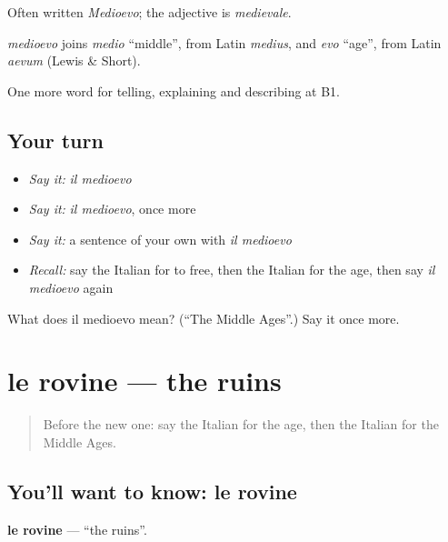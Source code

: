 Often written \emph{Medioevo}; the adjective is \emph{medievale}.

\begin{cousinweb}
\emph{medioevo} joins \emph{medio} \textquotedblleft{}middle\textquotedblright{}, from Latin \emph{medius}, and \emph{evo} \textquotedblleft{}age\textquotedblright{}, from Latin \emph{aevum} (Lewis \& Short).
\end{cousinweb}

\begin{grammarlens}[title={What you've built}]
One more word for telling, explaining and describing at B1.
\end{grammarlens}

\subsection*{Your turn}
\begin{itemize}
\raggedright
  \item \emph{Say it:} \emph{il medioevo}
  \item \emph{Say it:} \emph{il medioevo}, once more
  \item \emph{Say it:} a sentence of your own with \emph{il medioevo}
  \item \emph{Recall:} say the Italian for to free, then the Italian for the age, then say \emph{il medioevo} again
\end{itemize}

\begin{tcolorbox}[breakable,colback=teal!4,colframe=teal!35!black,title={Before you move on}]
What does il medioevo mean? (\textquotedblleft{}The Middle Ages\textquotedblright{}.) Say it once more.
\end{tcolorbox}
\section[le rovine]{le rovine — the ruins}

\label{lesson:IT-C330-rovine}



\begin{quote}
Before the new one: say the Italian for the age, then the Italian for the Middle Ages.
\end{quote}

\subsection*{You'll want to know: le rovine}
\textbf{le rovine} — \textquotedblleft{}the ruins\textquotedblright{}.

